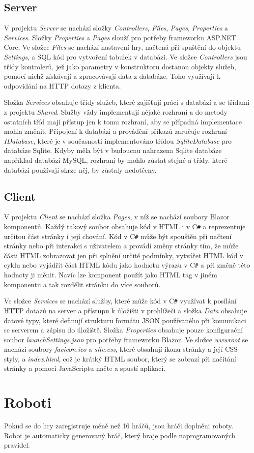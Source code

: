 \documentclass[a4paper,12pt]{article}
\def\CS{C\texttt{\#}}
\begin{document}
\subsection{Server}
V projektu \textit{Server} se nachází složky \textit{Controllers}, \textit{Files}, \textit{Pages}, \textit{Properties} a \textit{Services}. Složky \textit{Properties} a \textit{Pages} slouží pro potřeby frameworku ASP.NET Core. Ve složce \textit{Files} se nachází nastavení hry, načtená při spuštění do objektu \textit{Settings}, a SQL kód pro vytvoření tabulek v databázi. Ve složce \textit{Controllers} jsou třídy kontrolerů, jež jako parametry v konstruktoru dostanou objekty služeb, pomocí nichž získávají a zpracovávají data z databáze. Toho využívají k odpovídání na HTTP dotazy z klienta.

Složka \textit{Services} obsahuje třídy služeb, které zajišťují práci s databází a se třídami z projektu \textit{Shared}. Služby vždy implementují nějaké rozhraní a do metody ostatních tříd mají přístup jen k tomu rozhraní, aby se případná implementace mohla změnit. Připojení k databázi a provádění příkazů zaručuje rozhraní \textit{IDatabase}, které je v současnosti implementováno třídou \textit{SqliteDatabase} pro databáze Sqlite. Kdyby měla být v budoucnu nahrazena Sqlite databáze například databází MySQL, rozhraní by mohlo zůstat stejné a třídy, které databázi používají skrze něj, by zůstaly nedotčeny.

\subsection{Client}
V projektu \textit{Client} se nachází složka \textit{Pages}, v níž se nachází soubory Blazor komponentů. Každý takový soubor obsahuje kód v HTML i v \CS{} a reprezentuje určitou část stránky i její chování. Kód v \CS{} může být spouštěn při načtení stránky nebo při interakci s uživatelem a provádí změny stránky tím, že může části HTML zobrazovat jen při splnění určité podmínky, vytvářet HTML kód v cyklu nebo vyjádřit část HTML kódu jako hodnotu výrazu v \CS{} a při změně této hodnoty ji měnit. Navíc lze komponent použít jako HTML tag v jiném komponentu a tak rozdělit stránku do více souborů.

Ve složce \textit{Services} se nachází služby, které může kód v \CS{} využívat k posílání HTTP dotazů na server a přístupu k úložišti v prohlížeči a složka \textit{Data} obsahuje datové typy, které definují strukturu formátu JSON používaného při komunikaci se serverem a zápisu do úložiště. Složka \textit{Properties} obsahuje pouze konfigurační soubor \textit{launchSettings.json} pro potřeby frameworku Blazor. Ve složce \textit{wwwroot} se nachází soubory \textit{favicon.ico} a \textit{site.css}, které obsahují ikonu stránky a její CSS styly, a \textit{index.html}, což je krátký HTML soubor, který se zobrazí při načítání stránky a pomocí JavaScriptu načte a spustí aplikaci.

\section{Roboti}
Pokud se do hry zaregistruje méně než 16 hráčů, jsou hráči doplněni roboty. Robot je automaticky generovaný hráč, který hraje podle naprogramovaných pravidel.

\newpage
\printbibliography[heading=bibintoc, title={Použitá literatura}]
\end{document}
